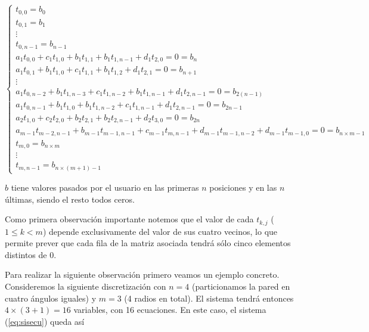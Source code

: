 \begin{equation}
\label{eq:sisecu}
  \left\lbrace
  \begin{array}{l}
     t_{0,0} = b_0 \\
     t_{0,1} = b_1 \\
     \vdots\\
     t_{0,n-1} = b_{n-1} \\
		 a_1 t_{0,0} + c_1 t_{1,0} + b_1 t_{1, 1} + b_1 t_{1, n-1} + d_1 t_{2, 0} = 0 = b_{n}\\
		 a_1 t_{0,1} + b_1 t_{1, 0} + c_1 t_{1,1} + b_1 t_{1,2} + d_1 t_{2,1} = 0 = b_{n+1} \\
		 \vdots\\
		 a_1 t_{0,n-2} + b_1 t_{1, n-3} + c_1 t_{1,n-2} + b_1 t_{1,n-1} + d_1 t_{2,n-1} = 0 = b_{2(n-1)} \\
		 a_1 t_{0,n-1} + b_1 t_{1, 0} + b_1 t_{1, n-2} + c_1 t_{1,n-1} + d_1 t_{2, n-1} = 0= b_{2n - 1}\\
		 a_2 t_{1,0} + c_2 t_{2,0} + b_2 t_{2, 1} + b_2 t_{2, n-1}  + d_2 t_{3, 0} = 0 = b_{2n}\\

		 a_{m-1} t_{m-2,n-1} + b_{m-1} t_{m-1,n-1} + c_{m-1} t_{m, n-1} + d_{m-1} t_{m-1, n-2} + d_{m-1} t_{m-1, 0} = 0 = b_{n\times m -1}\\
		 t_{m,0} = b_{n\times m}\\
		 \vdots\\
		 t_{m, n-1} = b_{n\times (m+1)-1}
		 
  \end{array}
  \right.
\end{equation}

$b$ tiene valores pasados por el usuario en las primeras $n$ posiciones y en las $n$ últimas, siendo el resto todos ceros.

Como primera observación importante notemos que el valor de cada $t_{k,j}$ ($1\leq k < m$) depende exclusivamente del valor de sus cuatro vecinos, lo que permite prever que cada fila de la matriz asociada tendrá sólo cinco elementos distintos de 0.

Para realizar la siguiente observación primero veamos un ejemplo concreto. Consideremos la siguiente discretización con $n = 4$ (particionamos la pared en cuatro ángulos iguales) y $m = 3$ (4 radios en total). El sistema tendrá entonces $4\times (3+1) = 16$ variables, con 16 ecuaciones. En este caso, el sistema (\ref{eq:sisecu}) queda así

